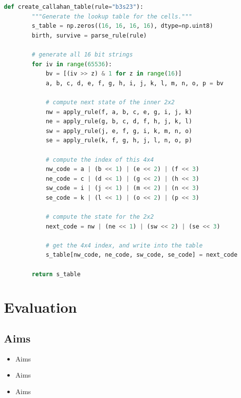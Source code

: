 \documentclass{l4proj}
\begin{document}
\begin{lstlisting}[language=python, float, caption={The algorithm for packing the $3\times 3$ outer-totalistic binary CA successor rule into a 
    $16\times 16\times 16\times 16$ 4 bit lookup table, running an equivalent, notionally 16-state $2\times 2$ CA.}, label=lst:callahan]
    def create_callahan_table(rule="b3s23"):
        """Generate the lookup table for the cells."""        
        s_table = np.zeros((16, 16, 16, 16), dtype=np.uint8)
        birth, survive = parse_rule(rule)

        # generate all 16 bit strings
        for iv in range(65536):
            bv = [(iv >> z) & 1 for z in range(16)]
            a, b, c, d, e, f, g, h, i, j, k, l, m, n, o, p = bv

            # compute next state of the inner 2x2
            nw = apply_rule(f, a, b, c, e, g, i, j, k)
            ne = apply_rule(g, b, c, d, f, h, j, k, l)
            sw = apply_rule(j, e, f, g, i, k, m, n, o)
            se = apply_rule(k, f, g, h, j, l, n, o, p)

            # compute the index of this 4x4
            nw_code = a | (b << 1) | (e << 2) | (f << 3)
            ne_code = c | (d << 1) | (g << 2) | (h << 3)
            sw_code = i | (j << 1) | (m << 2) | (n << 3)
            se_code = k | (l << 1) | (o << 2) | (p << 3)

            # compute the state for the 2x2
            next_code = nw | (ne << 1) | (sw << 2) | (se << 3)

            # get the 4x4 index, and write into the table
            s_table[nw_code, ne_code, sw_code, se_code] = next_code

        return s_table

\end{lstlisting}

\chapter{Evaluation} 

\section{Aims}
\begin{itemize}
    \item Aims
    \item Aims
    \item Aims
\end{itemize}
\end{document}
